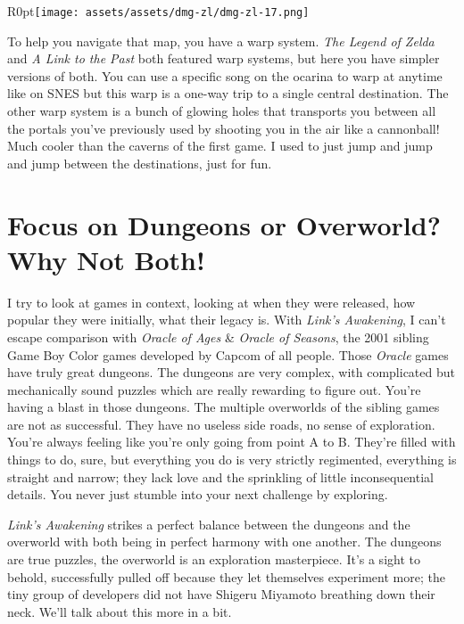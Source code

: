 \documentclass{book}
\begin{document}
\begin{wrapfigure}{R}{0pt}{\texttt{[image: assets/assets/dmg-zl/dmg-zl-17.png]}}\end{wrapfigure}
To help you navigate that map, you have a warp system. \emph{The Legend of Zelda} and \emph{A Link to the Past} both featured warp systems, but here you have simpler versions of both. You can use a specific song on the ocarina to warp at anytime like on SNES but this warp is a one-way trip to a single central destination. The other warp system is a bunch of glowing holes that transports you between all the portals you’ve previously used by shooting you in the air like a cannonball! Much cooler than the caverns of the first game. I used to just jump and jump and jump between the destinations, just for fun.\par
\FloatBarrier\section*{Focus on Dungeons or Overworld? Why Not Both!}
I try to look at games in context, looking at when they were released, how popular they were initially, what their legacy is. With \emph{Link’s Awakening}, I can’t escape comparison with \emph{Oracle of Ages} \& \emph{Oracle of Seasons}, the 2001 sibling Game Boy Color games developed by Capcom of all people. Those \emph{Oracle} games have truly great dungeons. The dungeons are very complex, with complicated but mechanically sound puzzles which are really rewarding to figure out. You’re having a blast in those dungeons. The multiple overworlds of the sibling games are not as successful. They have no useless side roads, no sense of exploration. You’re always feeling like you’re only going from point A to B. They’re filled with things to do, sure, but everything you do is very strictly regimented, everything is straight and narrow; they lack love and the sprinkling of little inconsequential details. You never just stumble into your next challenge by exploring.\par
\emph{Link’s Awakening} strikes a perfect balance between the dungeons and the overworld with both being in perfect harmony with one another. The dungeons are true puzzles, the overworld is an exploration masterpiece. It’s a sight to behold, successfully pulled off because they let themselves experiment more; the tiny group of developers did not have Shigeru Miyamoto breathing down their neck. We’ll talk about this more in a bit.\par
\FloatBarrier\vspace{\baselineskip}\begin{figure}[H]\end{figure}
\end{document}
